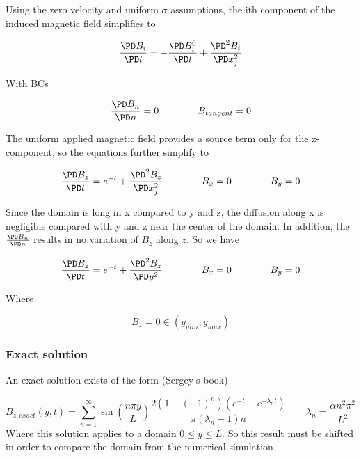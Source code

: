 \documentclass[11pt]{article}
\begin{document}
Using the zero velocity and uniform $\sigma$ assumptions, the ith component of the induced magnetic field simplifies to

\begin{equation}
	\frac{\PD B_i}{\PD t}
	=
	-
	\frac{\PD B_i^0}{\PD t}
	+
	\frac{\PD^2 B_i}{\PD x_j^2}
\end{equation}

With BCs

\begin{equation}
	\frac{\PD B_{n}}{\PD n} = 0
	\qquad \qquad
	B_{tangent} = 0
\end{equation}

The uniform applied magnetic field provides a source term only for the z-component, so the equations further simplify to

\begin{equation}
	\frac{\PD B_z}{\PD t}
	=
	e^{-t}
	+
	\frac{\PD^2 B_z}{\PD x_j^2}
	\qquad \qquad
	B_x = 0
	\qquad \qquad
	B_y = 0
\end{equation}

Since the domain is long in x compared to y and z, the diffusion along x is negligible compared with y and z near the center of the domain. In addition, the $\frac{\PD B_n}{\PD n}$ results in no variation of $B_z$ along $z$. So we have

\begin{equation}
	\frac{\PD B_z}{\PD t}
	=
	e^{-t}
	+
	\frac{\PD^2 B_z}{\PD y^2}
	\qquad \qquad
	B_x = 0
	\qquad \qquad
	B_y = 0
\end{equation}

Where

\begin{equation}
	B_z = 0
	\in (y_{min}, y_{max})
\end{equation}

\subsubsection{Exact solution}

An exact solution exists of the form (Sergey's book)

\begin{equation}
	\boxed{
	B_{z,exact}(y,t)
	=
	\sum_{n=1}^{\infty}
	\sin \left( \frac{n\pi y}{L} \right)
	\frac{2 (1 - (-1)^n) (e^{-t}-e^{-\lambda_n t})}{\pi (\lambda_n-1)n}
	}
	\qquad
	\boxed{
	\lambda_n = \frac{\alpha n^2\pi^2}{L^2}
	}
\end{equation}
Where this solution applies to a domain $0 \le y \le L$. So this result must be shifted in order to compare the domain from the numerical simulation.
\end{document}
